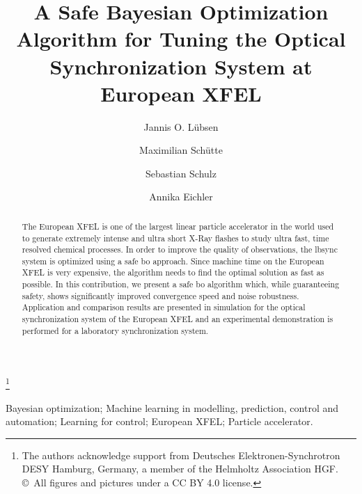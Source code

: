 \documentclass{ifacconf}
\newcounter{part}
\begin{document}
\begin{frontmatter}

\title{A Safe Bayesian Optimization Algorithm for Tuning the Optical Synchronization System at European XFEL} 
\thanks[footnoteinfo]{The authors acknowledge support from Deutsches Elektronen-Synchrotron DESY Hamburg, Germany, a member of the Helmholtz Association HGF. \copyright\ All figures and pictures under a CC BY 4.0 license.}

\author[First]{Jannis O. Lübsen} 
\author[Second,First]{Maximilian Sch\"utte} 
\author[Second]{Sebastian Schulz} 
\author[First,Second]{Annika Eichler}

\address[First]{Hamburg University of Technology, Institute of Control Systems, Eißendorfer Straße 40 21073 Hamburg, Germany, \\(e-mail: jannis.luebsen@tuhh.de)}
\address[Second]{Deutsches Elektronen-Synchrotron DESY, Notkestr. 85 22607 Hamburg, Germany \\(e-mail: maximilian.schuette@desy.de).}

\begin{abstract}                %
The European XFEL is one of the largest linear particle accelerator in the world used to generate extremely intense and ultra short X-Ray flashes to study ultra fast, time resolved chemical processes. In order to improve the quality of observations, the \acrlong{lbsync} system is optimized using a safe \acrlong{bo} approach. Since machine time on the European XFEL is very expensive, the algorithm needs to find the optimal solution as fast as possible. In this contribution, we present a safe \acrlong{bo} algorithm which, while guaranteeing safety, shows significantly improved convergence speed and noise robustness. Application and comparison results are presented in simulation for the optical synchronization system of the European XFEL and an experimental demonstration is performed for a laboratory synchronization system. \end{abstract}

\begin{keyword}
Bayesian optimization; Machine learning in modelling, prediction, control and automation; Learning for control; European XFEL; Particle accelerator.
\end{keyword}

\end{frontmatter}
\end{document}
